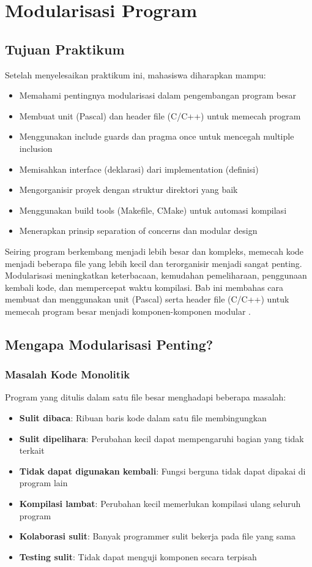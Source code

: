 \documentclass[../main.tex]{subfiles}
\begin{document}
\chapter{Modularisasi Program}

\section*{Tujuan Praktikum}
Setelah menyelesaikan praktikum ini, mahasiswa diharapkan mampu:
\begin{itemize}
  \item Memahami pentingnya modularisasi dalam pengembangan program besar
  \item Membuat unit (Pascal) dan header file (C/C++) untuk memecah program
  \item Menggunakan include guards dan pragma once untuk mencegah multiple inclusion
  \item Memisahkan interface (deklarasi) dari implementation (definisi)
  \item Mengorganisir proyek dengan struktur direktori yang baik
  \item Menggunakan build tools (Makefile, CMake) untuk automasi kompilasi
  \item Menerapkan prinsip separation of concerns dan modular design
\end{itemize}

Seiring program berkembang menjadi lebih besar dan kompleks, memecah kode menjadi beberapa file yang lebih kecil dan terorganisir menjadi sangat penting. Modularisasi meningkatkan keterbacaan, kemudahan pemeliharaan, penggunaan kembali kode, dan mempercepat waktu kompilasi. Bab ini membahas cara membuat dan menggunakan unit (Pascal) serta header file (C/C++) untuk memecah program besar menjadi komponen-komponen modular \parencite{free-pascal-docs,gnu-c-manual,cpp-reference}.

\section{Mengapa Modularisasi Penting?}

\subsection{Masalah Kode Monolitik}
Program yang ditulis dalam satu file besar menghadapi beberapa masalah:
\begin{itemize}
  \item \textbf{Sulit dibaca}: Ribuan baris kode dalam satu file membingungkan
  \item \textbf{Sulit dipelihara}: Perubahan kecil dapat mempengaruhi bagian yang tidak terkait
  \item \textbf{Tidak dapat digunakan kembali}: Fungsi berguna tidak dapat dipakai di program lain
  \item \textbf{Kompilasi lambat}: Perubahan kecil memerlukan kompilasi ulang seluruh program
  \item \textbf{Kolaborasi sulit}: Banyak programmer sulit bekerja pada file yang sama
  \item \textbf{Testing sulit}: Tidak dapat menguji komponen secara terpisah
\end{itemize}
\end{document}
